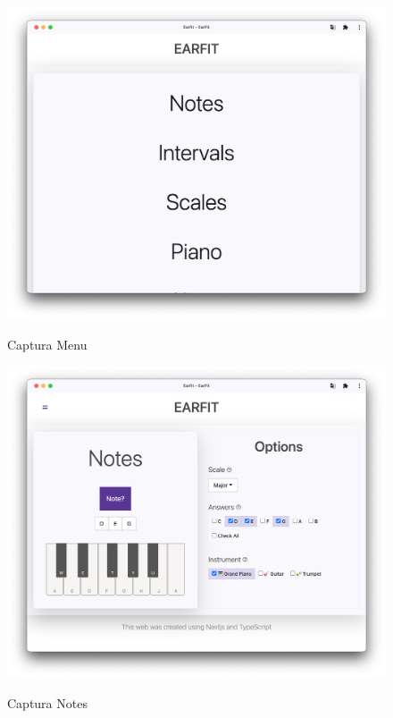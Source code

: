 \documentclass[12pt,twoside,titlepage]{report}
\begin{document}
\begin{figure}[H]
    \centering
    \includegraphics[scale=0.3]{Capturas Earfit/Tablet/Menu}
    \label{fig:TabletMenu}
    \caption{Captura Menu}
\end{figure}

\begin{figure}[H]
    \centering
    \includegraphics[scale=0.3]{Capturas Earfit/Tablet/Notes}
    \label{fig:TabletNotes}
    \caption{Captura Notes}
\end{figure}
\end{document}
